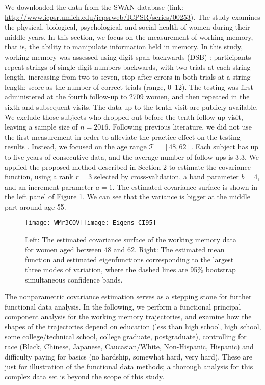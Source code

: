 \documentclass[11pt]{article}
\newcommand{\0}{{\mathbf{0}}}
\newcommand{\1}{{\mathbf{1}}}
\begin{document}
We downloaded the data from the SWAN database (link: \url{http://www.icpsr.umich.edu/icpsrweb/ICPSR/series/00253}). The study examines the physical, biological, psychological, and social health of women during their middle years. In this section, we focus on the measurement of working memory, that is, the ability to manipulate information held in memory. In this study, working memory was assessed using digit span backwards (DSB) \citep{WMmanual}: participants repeat strings of single-digit numbers backwards, with two trials at each string length, increasing from two to seven, stop after errors in both trials at a string length; score as the number of correct trials (range, 0--12).  The testing was first administered at the fourth follow-up to 2709 women, and then repeated in the sixth and subsequent visits. The data up to the tenth visit are publicly available. We exclude those subjects who dropped out before the tenth follow-up visit, leaving a sample size of $n=2016$. Following previous literature, we did not use the first measurement in order to alleviate the practice effect on the testing results \citep{karlamangla2017evidence}. 
Instead, we focused on the age range $\mathcal{T} = [48, 62]$. Each subject has up to five years of consecutive data, and the average number of follow-ups is 3.3. We applied the proposed method described in Section 2 to estimate the covariance function, using a rank $r= 3$ selected by cross-validation, a band parameter $b = 4$, and an increment parameter $a = 1$. The estimated covariance surface is shown in the left panel of Figure \ref{Fig:data}. We can see that the variance is bigger at the middle part around age 55.

\begin{figure}
	\centerline{
		\texttt{[image: WMr3COV]}\texttt{[image: Eigens\_CI95]}}
	\caption{Left: The estimated covariance surface of the working memory data for women aged between 48 and 62. Right: The estimated mean function and estimated eigenfunctions corresponding to the largest three modes of variation, where the dashed lines are 95\% bootstrap simultaneous confidence bands. }
	\label{Fig:data} 
\end{figure}

The nonparametric covariance estimation serves as a stepping stone for further functional data analysis. 
In the following, we perform a functional principal component analysis for the working memory trajectories, and examine how the shapes of the trajectories depend on education (less than high school, high school, some college/technical school, college graduate, postgraduate), controlling for race (Black, Chinese, Japanese, Caucasian/White, Non-Hispanic, Hispanic) and difficulty paying for basics (no hardship, somewhat hard, very hard). These are just for illustration of the functional data methods; a thorough analysis for this complex data set is beyond the scope of this study. 
\end{document}
